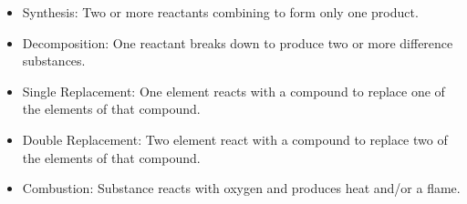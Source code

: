 \begin{itemize}
\item Synthesis: Two or more reactants combining to form only one product.
\item Decomposition: One reactant breaks down to produce two or more difference substances.
\item Single Replacement: One element reacts with a compound to replace one of the elements of that compound.
\item Double Replacement: Two element react with a compound to replace two of the elements of that compound.
\item Combustion: Substance reacts with oxygen and produces heat and/or a flame.
\end{itemize}

\noindent
{}

